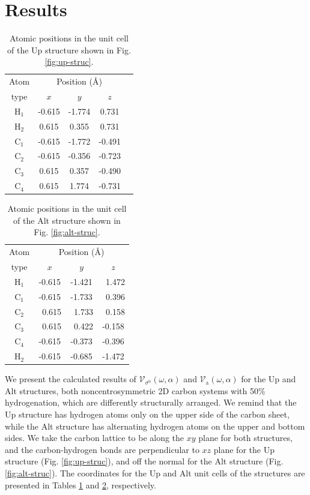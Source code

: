 \documentclass[floatfix,prb,aps,superscriptaddress,showpacs,11pt,preprint,letterpaper]{revtex4}
\begin{document}
\section{Results}
\label{sec:results}

\begin{table}[t]
\center
\begin{tabular}{ccccc}\\
\hline
\quad Atom \qquad & \multicolumn{3}{c}{Position (\AA)} \\
\cline{2-4}
\quad type \qquad & $x$ & $y$ & $z$  \\
\hline
H$_1$ & -0.615 & -1.774 &  0.731 \\
H$_2$ &  0.615 &  0.355 &  0.731 \\
C$_1$ & -0.615 & -1.772 & -0.491 \\
C$_2$ & -0.615 & -0.356 & -0.723 \\
C$_3$ &  0.615 &  0.357 & -0.490 \\
C$_4$ &  0.615 &  1.774 & -0.731 \\
\hline
\end{tabular}
\caption{
Atomic positions in the unit cell of the Up structure shown
in Fig. \ref{fig:up-struc}. 
}
\label{tab:up-unitcell}
\end{table}
\begin{table}[t]
\center
\begin{tabular}{cccc}\\
\hline
\quad Atom \qquad & \multicolumn{3}{c}{Position (\AA)} \\
\cline{2-4}
\quad type \qquad & $x$ & $y$ & $z$  \\
\hline
H$_1$ &  -0.615 &  -1.421 & \ 1.472 \\
C$_1$ &  -0.615 &  -1.733 & \ 0.396 \\
C$_2$ & \ 0.615 & \ 1.733 & \ 0.158 \\
C$_3$ & \ 0.615 & \ 0.422 &  -0.158 \\
C$_4$ &  -0.615 &  -0.373 &  -0.396 \\
H$_2$ &  -0.615 &  -0.685 &  -1.472 \\
\hline
\end{tabular}
\caption{
Atomic positions in the unit cell of the Alt structure
 shown in Fig. \ref{fig:alt-struc}. 
}
\label{tab:alt-unitcell}
\end{table}

We present the calculated results of
$\mathcal{V}_{\sigma^{\mathrm{b}}}(\omega,\alpha)$ and
$\mathcal{V}_{\mathrm{a}}(\omega,\alpha)$ for the Up  and
Alt structures, both noncentrosymmetric 2D carbon systems with
50\% hydrogenation, which are differently structurally arranged. We remind that
the Up structure has hydrogen atoms only on the upper side of the carbon sheet,
while the Alt structure has alternating hydrogen atoms on the upper and bottom
sides. We take the carbon lattice to be along the $xy$ plane for both
structures, and the carbon-hydrogen bonds are
perpendicular to  $xz$ plane for the Up structure
(Fig. \ref{fig:up-struc}),
 and off the normal for the Alt structure 
(Fig. \ref{fig:alt-struc}). The coordinates for the Up and Alt unit cells of the
structures are presented in Tables \ref{tab:up-unitcell} and 
\ref{tab:alt-unitcell}, respectively.
\end{document}
